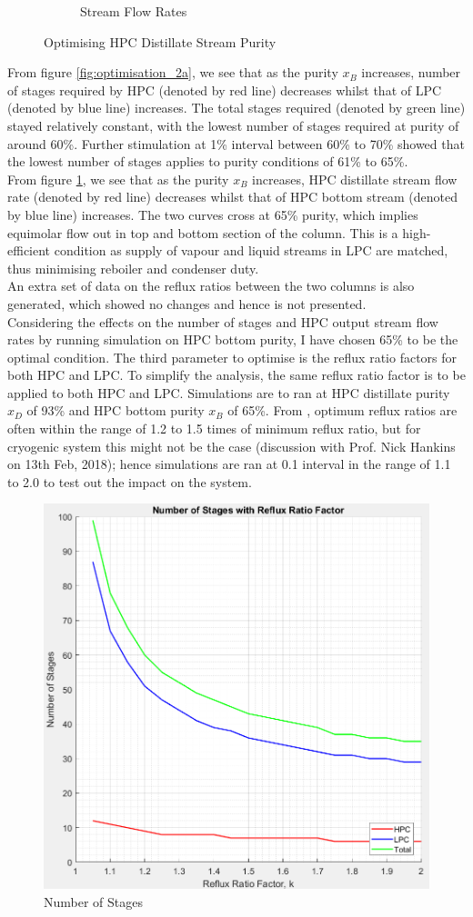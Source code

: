 \begin{figure}[ht]
\begin{subfigure}{0.49\textwidth}
            \caption{Stream Flow Rates} \label{fig:optimisation_2b}
        \end{subfigure}
        \caption{Optimising HPC Distillate Stream Purity} \label{fig:optimsation_2}
    \end{figure}
	From figure \ref{fig:optimisation_2a}, we see that as the purity $x_B$ increases, number of stages required by HPC (denoted by red line) decreases whilst that of LPC (denoted by blue line) increases. The total stages required (denoted by green line) stayed relatively constant, with the lowest number of stages required at purity of around 60\%. Further stimulation at 1\% interval between 60\% to 70\% showed that the lowest number of stages applies to purity conditions of 61\% to 65\%. \\
	From figure \ref{fig:optimisation_2b}, we see that as the purity $x_B$ increases, HPC distillate stream flow rate (denoted by red line) decreases whilst that of HPC bottom stream (denoted by blue line) increases. The two curves cross at 65\% purity, which implies equimolar flow out in top and bottom section of the column. This is a high-efficient condition as supply of vapour and liquid streams in LPC are matched, thus minimising reboiler and condenser duty.\\
	An extra set of data on the reflux ratios between the two columns is also generated, which showed no changes and hence is not presented.\\
	Considering the effects on the number of stages and HPC output stream flow rates by running simulation on HPC bottom purity, I have chosen 65\% to be the optimal condition.
    The third parameter to optimise is the reflux ratio factors for both HPC and LPC. To simplify the analysis, the same reflux ratio factor is to be applied to both HPC and LPC. Simulations are to ran at HPC distillate purity $x_D$ of 93\% and HPC bottom purity $x_B$ of 65\%. From \cite{treybal2004}, optimum reflux ratios are often within the range of 1.2 to 1.5 times of minimum reflux ratio, but for cryogenic system this might not be the case (discussion with Prof. Nick Hankins on 13th Feb, 2018); hence simulations are ran at 0.1 interval in the range of 1.1 to 2.0 to test out the impact on the system.
    \begin{figure}[H]
        \centering
        \includegraphics[width=0.45\linewidth]{graph-stages_vs_R.jpeg}
        \caption{Number of Stages}
        \label{fig:optimisation_3}
    \end{figure}
